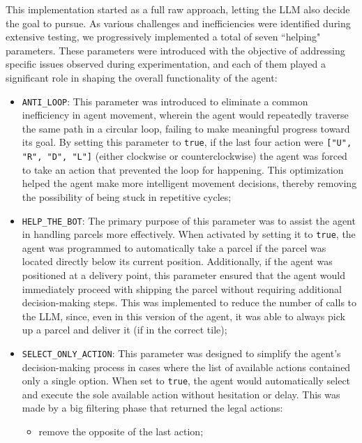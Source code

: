This implementation started as a full raw approach, letting the LLM also decide
the goal to pursue. As various challenges and inefficiencies were identified during
extensive testing, we progressively implemented a total of seven ``helping" parameters.
These parameters were introduced with the objective of addressing specific
issues observed during experimentation, and each of them played a significant role
in shaping the overall functionality of the agent:
\begin{itemize}
  \item \texttt{ANTI\_LOOP}: This parameter was introduced to eliminate a common
    inefficiency in agent movement, wherein the agent would repeatedly traverse
    the same path in a circular loop, failing to make meaningful progress toward
    its goal. By setting this parameter to \texttt{true}, if the last four
    action were \texttt{["U", "R", "D", "L"]} (either clockwise or
    counterclockwise) the agent was forced to take an action that prevented the loop
    for happening. This optimization helped the agent make more intelligent
    movement decisions, thereby removing the possibility of being stuck in repetitive
    cycles;

  \item \texttt{HELP\_THE\_BOT}: The primary purpose of this parameter was to assist
    the agent in handling parcels more effectively. When activated by setting it
    to \texttt{true}, the agent was programmed to automatically take a parcel if
    the parcel was located directly below its current position. Additionally, if
    the agent was positioned at a delivery point, this parameter ensured that the
    agent would immediately proceed with shipping the parcel without requiring additional
    decision-making steps. This was implemented to reduce the number of calls to
    the LLM, since, even in this version of the agent, it was able to always pick
    up a parcel and deliver it (if in the correct tile);

  \item \texttt{SELECT\_ONLY\_ACTION}: This parameter was designed to simplify the
    agent's decision-making process in cases where the list of available actions
    contained only a single option. When set to \texttt{true}, the agent would
    automatically select and execute the sole available action without
    hesitation or delay. This was made by a big filtering phase that returned the
    legal actions:
    \begin{itemize}
      \item remove the opposite of the last action;


\end{itemize}
\end{itemize}
